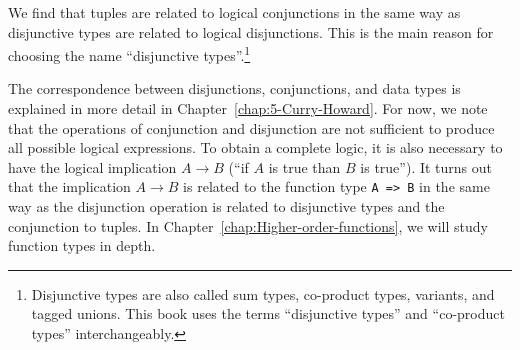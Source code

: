 We find that tuples are related to logical conjunctions in the same
way as disjunctive types are related to logical disjunctions. This
is the main reason for choosing the name \textsf{``}disjunctive types\textsf{''}.\footnote{Disjunctive types are also called sum types, co-product types, variants,
and tagged unions. This book uses the terms \textsf{``}disjunctive types\textsf{''}
and \textsf{``}co-product types\textsf{''} interchangeably.}

The correspondence between disjunctions, conjunctions, and data types
is explained in more detail in Chapter~\ref{chap:5-Curry-Howard}.
For now, we note that the operations of conjunction and disjunction
are not sufficient to produce all possible logical expressions. To
obtain a complete logic, it is also necessary to have the logical
implication $A\rightarrow B$ (\textsf{``}if $A$ is true than $B$ is true\textsf{''}).
It turns out that the implication $A\rightarrow B$ is related to
the function type \lstinline!A => B! in the same way as the disjunction
operation is related to disjunctive types and the conjunction to tuples.
In Chapter~\ref{chap:Higher-order-functions}, we will study function
types in depth.
